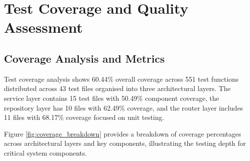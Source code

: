 \section{Test Coverage and Quality Assessment} \label{section:test_coverage_quality}

\subsection{Coverage Analysis and Metrics} \label{subsection:coverage_analysis}

Test coverage analysis shows 60.44\% overall coverage across 551 test functions distributed across 43 test files organised into three architectural layers. The service layer contains 15 test files with 50.49\% component coverage, the repository layer has 10 files with 62.49\% coverage, and the router layer includes 11 files with 68.17\% coverage focused on unit testing.

Figure \ref{fig:coverage_breakdown} provides a breakdown of coverage percentages across architectural layers and key components, illustrating the testing depth for critical system components.

